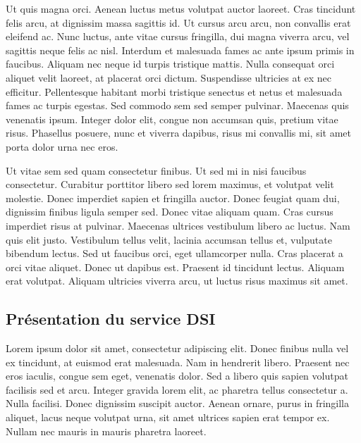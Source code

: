 \documentclass[a4paper,12pt]{report}
\begin{document}
Ut quis magna orci. Aenean luctus metus volutpat auctor laoreet. Cras tincidunt felis arcu, at dignissim massa sagittis id. Ut cursus arcu arcu, non convallis erat eleifend ac. Nunc luctus, ante vitae cursus fringilla, dui magna viverra arcu, vel sagittis neque felis ac nisl. Interdum et malesuada fames ac ante ipsum primis in faucibus. Aliquam nec neque id turpis tristique mattis. Nulla consequat orci aliquet velit laoreet, at placerat orci dictum. Suspendisse ultricies at ex nec efficitur. Pellentesque habitant morbi tristique senectus et netus et malesuada fames ac turpis egestas. Sed commodo sem sed semper pulvinar. Maecenas quis venenatis ipsum. Integer dolor elit, congue non accumsan quis, pretium vitae risus. Phasellus posuere, nunc et viverra dapibus, risus mi convallis mi, sit amet porta dolor urna nec eros.

Ut vitae sem sed quam consectetur finibus. Ut sed mi in nisi faucibus consectetur. Curabitur porttitor libero sed lorem maximus, et volutpat velit molestie. Donec imperdiet sapien et fringilla auctor. Donec feugiat quam dui, dignissim finibus ligula semper sed. Donec vitae aliquam quam. Cras cursus imperdiet risus at pulvinar. Maecenas ultrices vestibulum libero ac luctus. Nam quis elit justo. Vestibulum tellus velit, lacinia accumsan tellus et, vulputate bibendum lectus. Sed ut faucibus orci, eget ullamcorper nulla. Cras placerat a orci vitae aliquet. Donec ut dapibus est. Praesent id tincidunt lectus. Aliquam erat volutpat. Aliquam ultricies viverra arcu, ut luctus risus maximus sit amet.

\subsection{Présentation du service  \ac{DSI}}  %
Lorem ipsum dolor sit amet, consectetur adipiscing elit. Donec finibus nulla vel ex tincidunt, at euismod erat malesuada. Nam in hendrerit libero. Praesent nec eros iaculis, congue sem eget, venenatis dolor. Sed a libero quis sapien volutpat facilisis sed et arcu. Integer gravida lorem elit, ac pharetra tellus consectetur a. Nulla facilisi. Donec dignissim suscipit auctor. Aenean ornare, purus in fringilla aliquet, lacus neque volutpat urna, sit amet ultrices sapien erat tempor ex. Nullam nec mauris in mauris pharetra laoreet.
\end{document}
